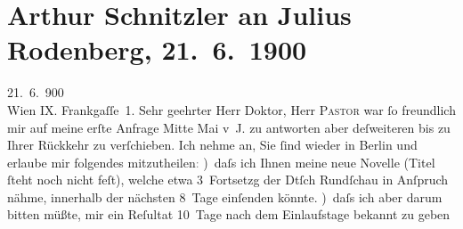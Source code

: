 

         
         \renewcommand{\erwaehntePersonen}{Personen: Willy Pastor, Julius Rodenberg}
         \renewcommand{\erwaehnteInstitutionen}{Institutionen: Deutsche Rundschau}
         \renewcommand{\erwaehnteOrte}{Orte: Berlin, Frankgasse 1, Wien}
         \renewcommand{\erwaehnteWerke}{Werke: Frau Bertha Garlan. Roman}
               \section[Arthur Schnitzler an Julius Rodenberg, 21. 6. 1900]{ Arthur Schnitzler an Julius Rodenberg, 21. 6. 1900}\nopagebreak{}\rehead{ }\begin{ledgroupsized}[t]{13cm}\normalsize\beginnumbering{} \toendnotes[C]{\smallbreak\pagebreak[2]} 
\toendnotes[C]{\smallbreak}\pstart
           \raggedleft{}{\pb}21. 6. 900{\\}Wien IX. Frankgaſſe 1.\pend
           \pstart{}Sehr geehrter Herr Doktor,\pend\pstart
           Herr \textsc{Pastor} war ſo freundlich mir auf meine erſte Anfrage Mitte Mai v J. zu
               antworten aber deſweiteren bis zu Ihrer Rückkehr zu verſchieben. Ich nehme an, Sie
               ſind wieder in Berlin und erlaube mir folgendes
                  mitzutheilen\textcolor{gray}{:}\pend
           ) daſs ich Ihnen meine neue Novelle (Titel ſteht noch nicht {\pb}feſt),
               welche etwa 3 Fortsetzg der Dtſch Rundſchau in
               Anſpruch nähme, innerhalb der nächsten 8 Tage einſenden könnte.\pend
           ) daſs ich aber darum bitten müßte, mir ein Reſultat  10 Tage nach dem Einlaufstage bekannt zu geben\pend

\end{ledgroupsized}
